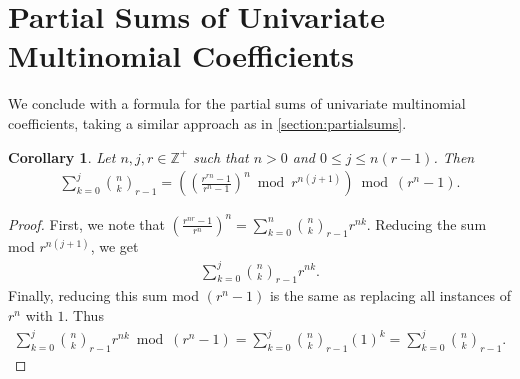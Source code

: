 \documentclass{article}
\theoremstyle{plain}
\newtheorem{corollary}{Corollary}[section]
\begin{document}
\section{Partial Sums of Univariate Multinomial Coefficients}
We conclude with a formula for the partial sums of univariate multinomial coefficients, taking a similar approach as in \cref{section:partialsums}.

\begin{corollary} \label{proof:multinomialcoeffpartialsums}
Let $n,j,r \in \mathbb{Z}^+$ such that $n > 0$ and $0 \leq j \leq n (r-1)$. Then
\begin{align*}
\sum_{k=0}^{j} \binom{n}{k}_{r-1}
= \left( \left( \frac{r^{rn}-1}{r^n-1} \right)^n \bmod r^{n(j+1)} \right) \bmod (r^n-1) .
\end{align*}
\end{corollary}
\begin{proof}
First, we note that $\left(\frac{r^{nr}-1}{r^n}\right)^n = \sum_{k=0}^n \binom{n}{k}_{r-1} r^{nk}$. Reducing the sum mod $r^{n(j+1)}$, we get
\begin{align*}
    \sum_{k=0}^{j} \binom{n}{k}_{r-1} r^{nk} .
\end{align*}
Finally, reducing this sum mod $(r^n-1)$ is the same as replacing all instances of $r^n$ with $1$. Thus
\begin{align*}
    \sum_{k=0}^{j} \binom{n}{k}_{r-1} r^{nk} \bmod (r^n-1)
    = \sum_{k=0}^{j} \binom{n}{k}_{r-1} (1)^{k}
    = \sum_{k=0}^{j} \binom{n}{k}_{r-1} .
\end{align*}
\end{proof}

\footnotesize
\begingroup
\raggedright


\endgroup
\end{document}
